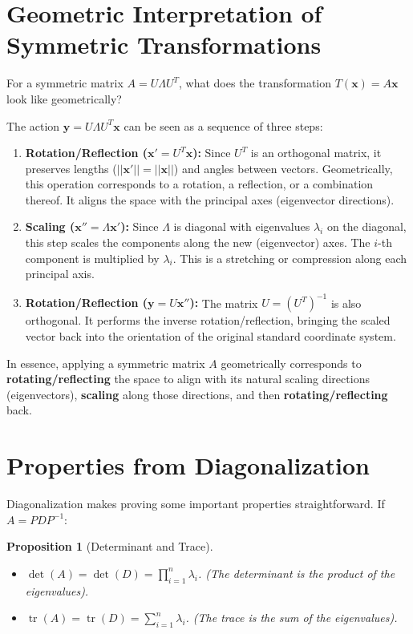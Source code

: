 \documentclass[11pt, a4paper]{article}
\theoremstyle{mytheoremstyle}
\newtheorem{proposition}[theorem]{Proposition}
\theoremstyle{mydefstyle}
\newcommand{\xb}{\mathbf{x}}     %
\newcommand{\yb}{\mathbf{y}}     %
\DeclareMathOperator{\tr}{tr}    %
\begin{document}
\section{Geometric Interpretation of Symmetric Transformations}

For a symmetric matrix $A = U \Lambda U^T$, what does the transformation $T(\xb) = A\xb$ look like geometrically?

The action $\yb = U \Lambda U^T \xb$ can be seen as a sequence of three steps:

\begin{enumerate}
    \item \textbf{Rotation/Reflection ($\xb' = U^T \xb$):} Since $U^T$ is an orthogonal matrix, it preserves lengths ($||\xb'|| = ||\xb||$) and angles between vectors. Geometrically, this operation corresponds to a rotation, a reflection, or a combination thereof. It aligns the space with the principal axes (eigenvector directions).

    \item \textbf{Scaling ($\xb'' = \Lambda \xb'$):} Since $\Lambda$ is diagonal with eigenvalues $\lambda_i$ on the diagonal, this step scales the components along the new (eigenvector) axes. The $i$-th component is multiplied by $\lambda_i$. This is a stretching or compression along each principal axis.

    \item \textbf{Rotation/Reflection ($\yb = U \xb''$):} The matrix $U = (U^T)^{-1}$ is also orthogonal. It performs the inverse rotation/reflection, bringing the scaled vector back into the orientation of the original standard coordinate system.
\end{enumerate}

In essence, applying a symmetric matrix $A$ geometrically corresponds to \textbf{rotating/reflecting} the space to align with its natural scaling directions (eigenvectors), \textbf{scaling} along those directions, and then \textbf{rotating/reflecting} back.

\section{Properties from Diagonalization}

Diagonalization makes proving some important properties straightforward. If $A = P D P^{-1}$:

\begin{proposition}[Determinant and Trace]
\leavevmode
\begin{itemize}
    \item $\det(A) = \det(D) = \prod_{i=1}^n \lambda_i$. (The determinant is the product of the eigenvalues).
    \item $\tr(A) = \tr(D) = \sum_{i=1}^n \lambda_i$. (The trace is the sum of the eigenvalues).
\end{itemize}
\end{proposition}
\end{document}
